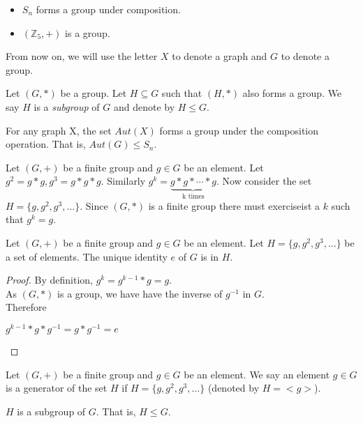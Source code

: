 \begin{example}
\begin{itemize}
\item $S_n$ forms a group under composition.
\item $(\mathbb{Z}_5,+)$ is a group.
\end{itemize}
\end{example}

From now on, we will use the letter $X$ to denote a graph and $G$ to denote a group.

\begin{remark} 
Let $(G,*)$ be a group. Let $H\subseteq G$ such that $(H,*)$ also forms a group. We say $H$ is a {\em subgroup} of $G$ and denote by $H\leq G$.   
\end{remark}


\begin{exercise}
For any graph X, the set $Aut(X)$ forms a group under the composition operation. That is, $Aut(G)\leq S_n$.
\end{exercise}


Let $(G,+)$ be a finite group and $g\in G$ be an element. Let $g^2 =  g*g ,g^3 =  g*g*g $. Similarly $g^k = \underbrace{g*g*\cdots * g}_\text{k times}$. Now consider the set $H=  \{g,g^2,g^3,\ldots\}$. Since $(G,*)$ is a finite group there must exerciseist a $k$ such that $g^k=g$.

\begin{lemma}
Let $(G,+)$ be a finite group and $g\in G$ be an element. Let $H=\{g,g^2,g^3,\ldots\}$ be a set of elements. The unique identity $e$ of $G$ is in $H$.
\end{lemma}
\begin{proof}
By definition, $g^k = g^{k-1}*g = g$. \\
As $(G,*)$ is a group, we have have the inverse of $g^{-1}$ in $G$.\\
Therefore
\begin{center}
$g^{k-1}*g*g^{-1} = g*g^{-1} = e$ 
\end{center}
\end{proof}

\begin{definition}[Generator]
Let $(G,+)$ be a finite group and $g\in G$ be an element. We say an element $g\in G$ is a generator of the set $H$ if $H=  \{g,g^2,g^3,\ldots\}$ (denoted by $H=<g>$).
\end{definition}

\begin{observation}$H$ is a subgroup of $G$. That is, $H\leq G$.
\end{observation}

